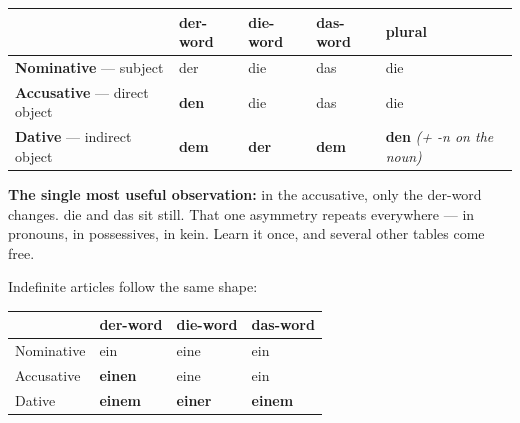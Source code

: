 \documentclass[
  11pt,
]{article}
\newcounter{none} %
\begin{document}
{\def\LTcaptype{none} %
\begin{longtable}[]{@{}
  >{\raggedright\arraybackslash}p{}
  >{\raggedright\arraybackslash}p{}
  >{\raggedright\arraybackslash}p{}
  >{\raggedright\arraybackslash}p{}
  >{\raggedright\arraybackslash}p{}@{}}
\toprule\noalign{}
\begin{minipage}[b]{\linewidth}\raggedright
\end{minipage} & \begin{minipage}[b]{\linewidth}\raggedright
der-word
\end{minipage} & \begin{minipage}[b]{\linewidth}\raggedright
die-word
\end{minipage} & \begin{minipage}[b]{\linewidth}\raggedright
das-word
\end{minipage} & \begin{minipage}[b]{\linewidth}\raggedright
plural
\end{minipage} \\
\midrule\noalign{}
\endhead
\bottomrule\noalign{}
\endlastfoot
\textbf{Nominative} --- subject & der & die & das & die \\
\textbf{Accusative} --- direct object & \textbf{den} & die & das &
die \\
\textbf{Dative} --- indirect object & \textbf{dem} & \textbf{der} &
\textbf{dem} & \textbf{den} \emph{(+ -n on the noun)} \\
\end{longtable}
}

\textbf{The single most useful observation:} in the accusative, only the
der-word changes. die and das sit still. That one asymmetry repeats
everywhere --- in pronouns, in possessives, in kein. Learn it once, and
several other tables come free.

Indefinite articles follow the same shape:

{\def\LTcaptype{none} %
\begin{longtable}[]{@{}llll@{}}
\toprule\noalign{}
& der-word & die-word & das-word \\
\midrule\noalign{}
\endhead
\bottomrule\noalign{}
\endlastfoot
Nominative & ein & eine & ein \\
Accusative & \textbf{einen} & eine & ein \\
Dative & \textbf{einem} & \textbf{einer} & \textbf{einem} \\
\end{longtable}
}
\end{document}
